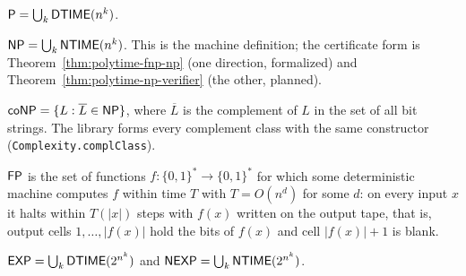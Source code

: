 \begin{definition}[$\cc{P}$]
  \label{def:P}
  \leanok
  $\mathsf{P} = \bigcup_{k} \mathsf{DTIME}(n^k)$.
\end{definition}

\begin{definition}[$\cc{NP}$]
  \label{def:NP}
  \leanok
  $\mathsf{NP} = \bigcup_{k} \mathsf{NTIME}(n^k)$. This is the machine definition;
  the certificate form is Theorem~\ref{thm:polytime-fnp-np} (one direction,
  formalized) and Theorem~\ref{thm:polytime-np-verifier} (the other, planned).
\end{definition}

\begin{definition}[$\cc{coNP}$]
  \label{def:coNP}
  \leanok
  $\mathsf{coNP} = \{L : \overline{L} \in \mathsf{NP}\}$, where $\overline{L}$ is the
  complement of $L$ in the set of all bit strings. The library forms every
  complement class with the same constructor
  (\texttt{Complexity.complClass}).
\end{definition}

\begin{definition}[$\cc{FP}$]
  \label{def:FP}
  \leanok
  $\cc{FP}$ is the set of functions $f \colon \{0,1\}^* \to \{0,1\}^*$ for which
  some deterministic machine computes $f$ within time $T$ with
  $T = O(n^d)$ for some $d$: on every input $x$ it halts within $T(|x|)$ steps
  with $f(x)$ written on the output tape, that is, output cells
  $1, \ldots, |f(x)|$ hold the bits of $f(x)$ and cell $|f(x)| + 1$ is blank.
\end{definition}

\begin{definition}
  \label{def:EXP}
  \leanok
  $\mathsf{EXP} = \bigcup_{k} \mathsf{DTIME}(2^{n^k})$ and
  $\mathsf{NEXP} = \bigcup_{k} \mathsf{NTIME}(2^{n^k})$.
\end{definition}

